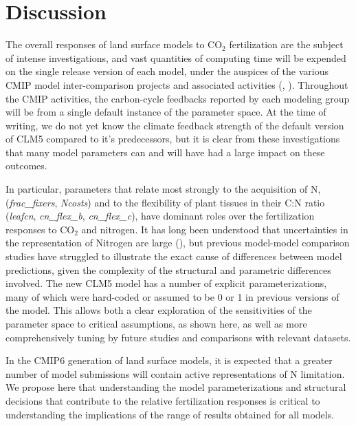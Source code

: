 \documentclass[draft,linenumbers]{agujournal}
\begin{document}
\section{Discussion}
The overall responses of land surface models to CO$_{2}$ fertilization are the subject of intense investigations, and vast quantities of computing time will be expended on the single release version of each model, under the auspices of the various CMIP model inter-comparison projects and associated activities  (\cite{meehl2014}, \cite{eyring2016}).  Throughout the CMIP activities, the carbon-cycle feedbacks reported by each modeling group will be from a single default instance of the parameter space. At the time of writing, we do not yet know the climate feedback strength of the default version of CLM5 compared to it's predecessors, but it is clear from these investigations that many model parameters can and will have had a large impact on these outcomes.  

In particular, parameters that relate most strongly to the acquisition of N, (\emph{frac\_fixers}, \emph{Ncosts}) and to the flexibility of plant tissues in their C:N ratio (\emph{leafcn}, \emph{cn\_flex\_b}, \emph{cn\_flex\_c}), have dominant roles over the fertilization responses to CO$_{2}$ and nitrogen.  It has long been understood that uncertainties in the representation of Nitrogen are large (\cite{zaehle2014}), but previous model-model comparison studies have struggled to illustrate the exact cause of differences between model predictions, given the complexity of the structural and parametric differences involved. The new CLM5 model has a number of explicit parameterizations, many of which were hard-coded or assumed to be 0 or 1 in previous versions of the model. This allows both a clear exploration of the sensitivities of the parameter space to critical assumptions, as shown here, as well as more comprehensively tuning by future studies and comparisons with relevant datasets. 

In the CMIP6 generation of land surface models, it is expected that a greater number of model submissions will contain active representations of N limitation. We propose here that understanding the model parameterizations and structural decisions that contribute to the relative fertilization responses is critical to understanding the implications of the range of results obtained for all models. 
\end{document}

